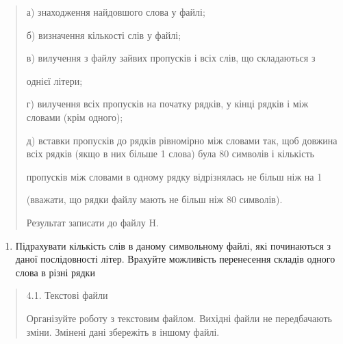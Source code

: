 \documentclass[]{article}
\begin{document}
\begin{quote}
а) знаходження найдовшого слова у файлі;

б) визначення кількості слів у файлі;

в) вилучення з файлу зайвих пропусків і всіх слів, що складаються з

однієї літери;

г) вилучення всіх пропусків на початку рядків, у кінці рядків і між
словами (крім одного);

д) вставки пропусків до рядків рівномірно між словами так, щоб довжина
всіх рядків (якщо в них більше 1 слова) була 80 символів і кількість

пропусків між словами в одному рядку відрізнялась не більш ніж на 1

(вважати, що рядки файлу мають не більш ніж 80 символів).

Результат записати до файлу H.
\end{quote}

\begin{enumerate}
\def\labelenumi{\arabic{enumi})}
\item
  Підрахувати кількість слів в даному символьному файлі, які починаються
  з даної послідовності літер. Врахуйте можливість перенесення складів
  одного слова в різні рядки
\end{enumerate}

\begin{quote}
4.1. Текстові файли

\protect\hypertarget{_Hlk65238588}{}{}Організуйте роботу з текстовим
файлом. Вихідні файли не передбачають зміни. Змінені дані збережіть в
іншому файлі.
\end{quote}
\end{document}

